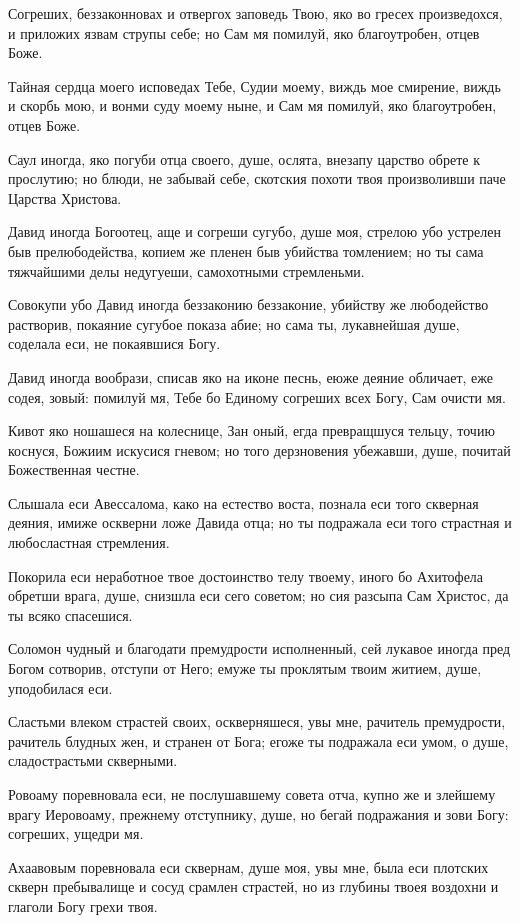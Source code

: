 Согреших, беззаконновах и отвергох заповедь Твою, яко во гресех произведохся, и приложих язвам струпы себе; но Сам мя помилуй, яко благоутробен, отцев Боже.


Тайная сердца моего исповедах Тебе, Судии моему, виждь мое смирение, виждь и скорбь мою, и вонми суду моему ныне, и Сам мя помилуй, яко благоутробен, отцев Боже.


Саул иногда, яко погуби отца своего, душе, ослята, внезапу царство обрете к прослутию; но блюди, не забывай себе, скотския похоти твоя произволивши паче Царства Христова.


Давид иногда Богоотец, аще и согреши сугубо, душе моя, стрелою убо устрелен быв прелюбодейства, копием же пленен быв убийства томлением; но ты сама тяжчайшими делы недугуеши, самохотными стремленьми.


Совокупи убо Давид иногда беззаконию беззаконие, убийству же любодейство растворив, покаяние сугубое показа абие; но сама ты, лукавнейшая душе, соделала еси, не покаявшися Богу.


Давид иногда вообрази, списав яко на иконе песнь, еюже деяние обличает, еже содея, зовый: помилуй мя, Тебе бо Единому согреших всех Богу, Сам очисти мя.


Кивот яко ношашеся на колеснице, Зан оный, егда превращшуся тельцу, точию коснуся, Божиим искусися гневом; но того дерзновения убежавши, душе, почитай Божественная честне.


Слышала еси Авессалома, како на естество воста, познала еси того скверная деяния, имиже оскверни ложе Давида отца; но ты подражала еси того страстная и любосластная стремления.


Покорила еси неработное твое достоинство телу твоему, иного бо Ахитофела обретши врага, душе, снизшла еси сего советом; но сия разсыпа Сам Христос, да ты всяко спасешися.


Соломон чудный и благодати премудрости исполненный, сей лукавое иногда пред Богом сотворив, отступи от Него; емуже ты проклятым твоим житием, душе, уподобилася еси.


Сластьми влеком страстей своих, оскверняшеся, увы мне, рачитель премудрости, рачитель блудных жен, и странен от Бога; егоже ты подражала еси умом, о душе, сладострастьми скверными.


Ровоаму поревновала еси, не послушавшему совета отча, купно же и злейшему врагу Иеровоаму, прежнему отступнику, душе, но бегай подражания и зови Богу: согреших, ущедри мя.


Ахаавовым поревновала еси сквернам, душе моя, увы мне, была еси плотских скверн пребывалище и сосуд срамлен страстей, но из глубины твоея воздохни и глаголи Богу грехи твоя.



